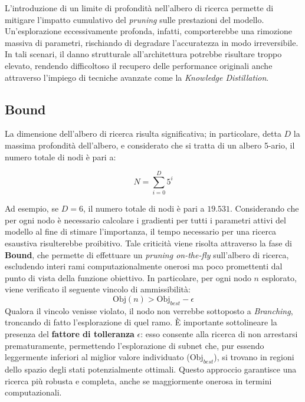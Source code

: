 L'introduzione di un limite di profondità nell'albero di ricerca permette di mitigare l'impatto cumulativo del \textit{pruning} sulle prestazioni del modello. Un'esplorazione eccessivamente profonda, infatti, comporterebbe una rimozione massiva di parametri, rischiando di degradare l'accuratezza in modo irreversibile. In tali scenari, il danno strutturale all'architettura potrebbe risultare troppo elevato, rendendo difficoltoso il recupero delle performance originali anche attraverso l'impiego di tecniche avanzate come la \textit{Knowledge Distillation}.

\subsection{Bound}
La dimensione dell'albero di ricerca risulta significativa; in particolare,
detta ${D}$ la massima profondità dell'albero, e considerato che si
tratta di un albero 5-ario, il numero totale di nodi è pari a:

\begin{equation}
    {N} = \sum_{i=0}^{{D}} 5^i
\end{equation}

Ad esempio, se ${D} = 6$, il numero totale di nodi è pari a $19.531$.
Considerando che per ogni nodo è necessario calcolare i gradienti per tutti i
parametri attivi del modello al fine di stimare l'importanza, il tempo
necessario per una ricerca esaustiva risulterebbe proibitivo. Tale criticità
viene risolta attraverso la fase di \textbf{Bound}, che permette di effettuare
un \textit{pruning on-the-fly} sull'albero di ricerca, escludendo interi rami
computazionalmente onerosi ma poco promettenti dal punto di vista della
funzione obiettivo. \newline In particolare, per ogni nodo $n$ esplorato, viene
verificato il seguente vincolo di ammissibilità:
\begin{equation}
    \text{Obj}(n) > \text{Obj}_{best} - \epsilon
\end{equation}
Qualora il vincolo venisse violato, il nodo non verrebbe sottoposto a \textit{Branching}, troncando di fatto l'esplorazione di quel ramo. È importante sottolineare la presenza del \textbf{fattore di tolleranza} $\epsilon$: esso consente alla ricerca di non arrestarsi prematuramente, permettendo l'esplorazione di subnet che, pur essendo leggermente inferiori al miglior valore individuato ($\text{Obj}_{best}$), si trovano in regioni dello spazio degli stati potenzialmente ottimali. Questo approccio garantisce una ricerca più robusta e completa, anche se maggiormente onerosa in termini computazionali.


